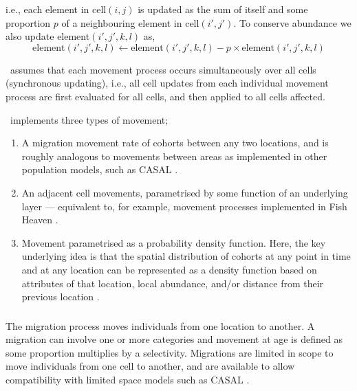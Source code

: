 i.e., each element in cell$(i,j)$ is updated as the sum of itself and some proportion $p$ of a neighbouring element in cell$(i',j')$. To conserve abundance we also update element$(i',j',k,l)$ as,
\begin{equation}
\text{element}(i',j',k,l)\leftarrow \text{element}(i',j',k,l) - p\times \text{element}(i',j',k,l)
\end{equation}

\SPM\ assumes that each movement process occurs simultaneously over all cells (synchronous updating), i.e., all cell updates from each individual movement process are first evaluated for all cells, and then applied to all cells affected. 

\SPM\ implements three types of movement;
\begin{enumerate}
	\item  A migration movement rate of cohorts between any two locations, and is roughly analogous to movements between areas as implemented in other population models, such as CASAL \citep{1388}. 
	\item An adjacent cell movements, parametrised by some function of an underlying layer --- equivalent to, for example, movement processes implemented in Fish Heaven \citep{1136,1135}.
	\item Movement parametrised as a probability density function. Here, the key underlying idea is that the spatial distribution of cohorts at any point in time and at any location can be represented as a density function based on attributes of that location, local abundance, and/or distance from their previous location \citep{1366,1367}. 
\end{enumerate}

\subsubsection{}

The migration process moves individuals from one location to another. A migration can involve one or more categories and movement at age is defined as some proportion multiplies by a selectivity. Migrations are limited in scope to move individuals from one cell to another, and are available to allow compatibility with limited space models such as CASAL \cite{1388}.

\subsubsection{}

